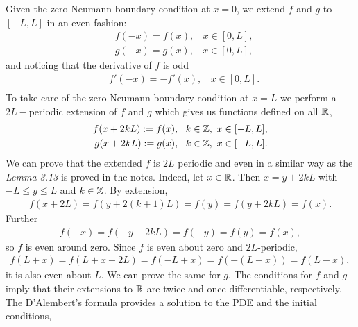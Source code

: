 \begin{questions}

\begin{solution}
Given the zero Neumann boundary condition at $x=0$, we extend $f$ and $g$ to $[-L,L]$ in an even fashion:
\begin{align*}
&f(-x)=f(x),~~~~x\in[0,L],\\
&g(-x)=g(x),~~~~x\in[0,L],
\end{align*}
and noticing that the derivative of $f$ is odd
\begin{align*}
&f'(-x)=-f'(x),~~~~x\in[0,L].\\
\end{align*}
To take care of the zero Neumann boundary condition at $x=L$ we perform a $2L-$periodic extension of $f$ and $g$ which gives us functions defined on all $\mathbb{R}$,
\begin{align*}
f(x+2kL):=f(x),~~k\in\mathbb{Z},~x\in[-L,L],\\
g(x+2kL):=g(x),~~k\in\mathbb{Z},~x\in[-L,L].
\end{align*}
We can prove that the extended $f$ is $2L$ periodic and even in a similar way as the \textsl{Lemma 3.13} is proved in the notes. Indeed, let $x\in\mathbb{R}$. Then $x=y+2kL$ with $-L\leq y \leq L$ and $k\in\mathbb{Z}$. By extension,
\begin{align*}
f(x+2L)=f(y+2(k+1)L)=f(y)=f(y+2kL)=f(x).
\end{align*}
Further
\begin{align*}
f(-x)=f(-y-2kL)=f(-y)=f(y)=f(x),
\end{align*}
so $f$ is even around zero. Since $f$ is even about zero and $2L$-periodic,
\begin{align*}
f(L+x)=f(L+x-2L)=f(-L+x)=f(-(L-x))=f(L-x),
\end{align*}
it is also even about $L$. We can prove the same for $g$. The conditions for $f$ and $g$ imply that their extensions to $\mathbb{R}$ are twice and once differentiable, respectively. The D'Alembert's formula provides a solution to the PDE and the initial conditions,

\end{solution}
\end{questions}
